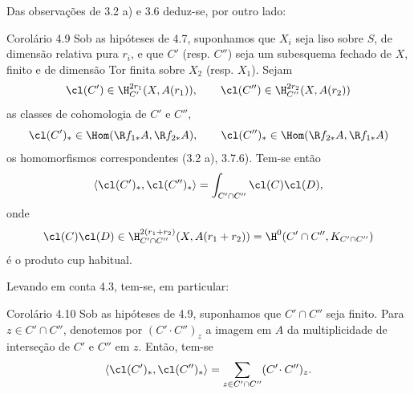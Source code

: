 Das observações de 3.2 a) e 3.6 deduz-se, por outro lado:

\begin{statement}{Corolário 4.9}
Sob as hipóteses de 4.7, suponhamos que $X_i$ seja liso sobre $S$, de dimensão relativa pura $r_i$, e que $C'$ (resp. $C''$) seja um subesquema fechado de $X$, finito e de dimensão Tor finita sobre $X_2$ (resp. $X_1$). Sejam
\[
\cl(C')\in \H_{C'}^{2r_1}(X,A(r_1)),\qquad
\cl(C'')\in \H_{C''}^{2r_2}(X,A(r_2))
\]
as classes de cohomologia de $C'$ e $C''$,
\[
\cl(C')_*\in\Hom(\R f_{1*}A,\R f_{2*}A),\qquad
\cl(C'')_*\in\Hom(\R f_{2*}A,\R f_{1*}A)
\]
os homomorfismos correspondentes (3.2 a), 3.7.6). Tem-se então
\[
\langle \cl(C')_*,\cl(C'')_*\rangle
=
\int_{C'\cap C''}\cl(C)\cl(D),
\]
onde
\[
\cl(C)\cl(D)\in
\H_{C'\cap C''}^{2(r_1+r_2)}(X,A(r_1+r_2))
=
\H^0(C'\cap C'',K_{C'\cap C''})
\]
é o produto cup habitual.
\end{statement}

Levando em conta 4.3, tem-se, em particular:

\begin{statement}{Corolário 4.10}
Sob as hipóteses de 4.9, suponhamos que $C'\cap C''$ seja finito. Para $z\in C'\cap C''$, denotemos por $(C'\!\cdot C'')_z$ a imagem em $A$ da multiplicidade de interseção de $C'$ e $C''$ em $z$. Então, tem-se
\[
\langle \cl(C')_*,\cl(C'')_*\rangle
=
\sum_{z\in C'\cap C''}(C'\!\cdot C'')_z.
\]
\end{statement}

